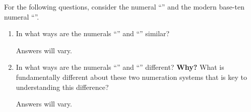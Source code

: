 For the following questions, consider the  numeral ``'' and the modern base-ten numeral ``''.
\begin{enumerate}

    \item In what ways are the numerals ``'' and ``'' similar?

    \begin{ansenv}
    \vspace{20pt}
        Answers will vary.
    \end{ansenv}

    \vfill

    \item In what ways are the numerals ``'' and ``'' different? \textbf{Why?} What is fundamentally different about these two numeration systems that is key to understanding this difference?

    \begin{ansenv}
    \vspace{20pt}
        Answers will vary.
    \end{ansenv}
    
    \vfill

\end{enumerate}